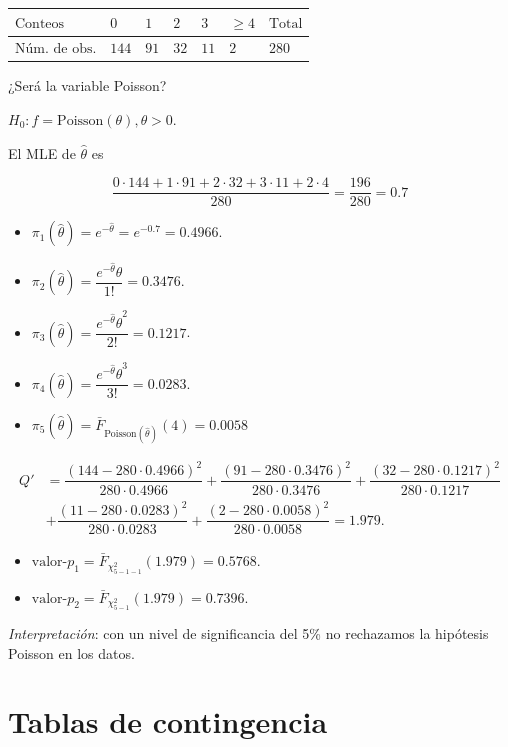 \documentclass[
  12pt,
]{book}
\begin{document}
\begin{longtable}[]{@{}lllllll@{}}
\toprule
\(\text{Conteos}\) & \(0\) & \(1\) & \(2\) & \(3\) & \(\ge 4\) & \(\text{Total}\)\tabularnewline
\midrule
\endhead
\(\text{Núm. de obs.}\) & \(144\) & \(91\) & \(32\) & \(11\) & \(2\) & \(280\)\tabularnewline
\bottomrule
\end{longtable}

¿Será la variable Poisson?

\(H_0: f = \text{Poisson}(\theta), \theta>0\).

El MLE de \(\hat\theta\) es

\[\dfrac{0\cdot 144+1\cdot91+2\cdot32+3\cdot 11+2\cdot4}{280} = \dfrac{196}{280} = 0.7\]

\begin{itemize}
\item
  \(\pi_1(\hat\theta) = e^{-\hat\theta} = e^{-0.7}=0.4966\).
\item
  \(\pi_2(\hat\theta) = \dfrac{e^{-\hat\theta}\hat\theta}{1!} = 0.3476\).
\item
  \(\pi_3(\hat\theta) = \dfrac{e^{-\hat\theta}\hat\theta^2}{2!} = 0.1217\).
\item
  \(\pi_4(\hat\theta) = \dfrac{e^{-\hat\theta}\hat\theta^3}{3!} = 0.0283\).
\item
  \(\pi_5(\hat\theta) = \bar F_{\text{Poisson}(\hat\theta)}(4) = 0.0058\)
\end{itemize}

\begin{align*}
Q' & = \dfrac{(144-280\cdot0.4966)^2}{280\cdot0.4966}+\dfrac{(91-280\cdot0.3476)^2}{280\cdot0.3476}+\dfrac{(32-280\cdot0.1217)^2}{280\cdot0.1217}\\
& +\dfrac{(11-280\cdot0.0283)^2}{280\cdot0.0283} +\dfrac{(2-280\cdot0.0058)^2}{280\cdot0.0058} = 1.979.
\end{align*}

\begin{itemize}
\item
  \(\text{valor-}p_1 =\bar F_{\chi^2_{5-1-1}}(1.979) = 0.5768\).
\item
  \(\text{valor-}p_2 = \bar F_{\chi^2_{5-1}}(1.979) = 0.7396\).
\end{itemize}

\emph{Interpretación}: con un nivel de significancia del 5\% no rechazamos la hipótesis Poisson en los datos.

\hypertarget{tablas-de-contingencia}{%
\chapter{Tablas de contingencia}\label{tablas-de-contingencia}}
\end{document}
